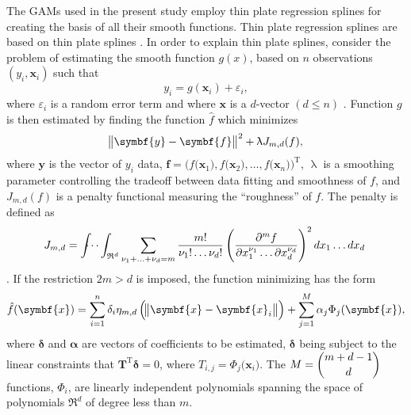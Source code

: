 The GAMs used in the present study employ thin plate regression splines \parencite{Wood2003} for creating the basis of all their smooth functions.  Thin plate regression splines are based on thin plate splines \parencite{Duchon1977}.  In order to explain thin plate splines, consider the problem of estimating the smooth function \(g(x)\), based on \(n\) observations \((y_i, \symbf{x}_i)\) such that
\begin{equation}
  \label{eq:ThinPlateSplinesModel}
  y_i = g(\symbf{x}_i) + \varepsilon_i,
\end{equation}
where \(\varepsilon_i\) is a random error term and where \(\symbf{x}\) is a \(d\)-vector \((d \leq n)\) \parencite{Wood2006}.  Function \(g\) is then estimated by finding the function \(\hat{f}\) which minimizes
\begin{equation}
  \label{eq:ThinPlateSplinesTermToMinimize}
  \norm{\symbf{y} - \symbf{f}}^2 + \uplambda J_{m, d}(f),
\end{equation}
where \(\symbf{y}\) is the vector of \(y_i\) data, \(\symbf{f} = \bigl(f\bigl(\symbf{x}_1\bigr), f\bigl(\symbf{x}_2\bigr), \ldots, f\bigl(\symbf{x}_n\bigr)\bigr)^{\text{T}}\), \(\uplambda\) is a smoothing parameter controlling the tradeoff between data fitting and smoothness of \(f\), and \(J_{m, d}(f)\) is a penalty functional measuring the ``roughness'' of \(f\).  The penalty is defined as
\begin{equation}
  \label{eq:ThinPlateSplinesPenalty}
  J_{m, d} = \int{\hspace{-3mm}}\cdots\int_{\mathfrak{R}^d} \sum_{\nu_1 + \ldots + \nu_d = m}\frac{m!}{\nu_1! \ldots \nu_d!} \left(\frac{\partial^mf}{\partial x_1^{\nu_1} \ldots \partial x_d^{\nu_d}}\right)^2 dx_1 \ldots dx_d~
\end{equation}
\parencite{Wood2006}.  If the restriction \(2m > d\) is imposed, the function minimizing  has the form
\begin{equation}
  \label{eq:ThinPlateSplinesMinimizingFunctionForm}
  \hat{f}(\symbf{x}) = \sum_{i = 1}^n \delta_i\eta_{m, d}\left(\norm{\symbf{x} - \symbf{x}_i}\right) + \sum_{j = 1}^M\alpha_j\Phi_j(\symbf{x}),
\end{equation}
where \(\symbf{\delta}\) and \(\symbf{\alpha}\) are vectors of coefficients to be estimated, \(\symbf{\delta}\) being subject to the linear constraints that \(\symbf{T}^{\text{T}}\symbf{\delta} = 0\), where \(T_{i, j} = \Phi_j\bigl(\symbf{x}_i\bigr)\).
The \(M = \dbinom{m + d - 1}{d}\) functions, \(\Phi_i\), are linearly independent polynomials spanning the space of polynomials \(\mathfrak{R}^d\) of degree less than \(m\).  %
